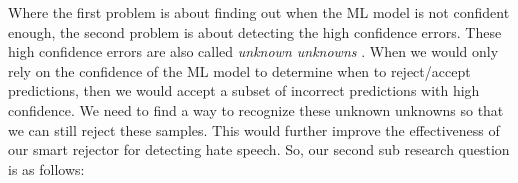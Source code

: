 Where the first problem is about finding out when the ML model is not confident enough, the second problem is about detecting the high confidence errors. These high confidence errors are also called \textit{unknown unknowns} \cite{liu2020towards}. When we would only rely on the confidence of the ML model to determine when to reject/accept predictions, then we would accept a subset of incorrect predictions with high confidence. We need to find a way to recognize these unknown unknowns so that we can still reject these samples. This would further improve the effectiveness of our smart rejector for detecting hate speech. So, our second sub research question is as follows:





